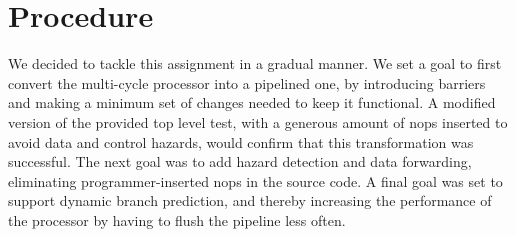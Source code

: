 \section{Procedure}

We decided to tackle this assignment in a gradual manner.
We set a goal to first convert the multi-cycle processor into a pipelined one, by introducing barriers and making a minimum set of changes needed to keep it functional.
A modified version of the provided top level test, with a generous amount of nops inserted to avoid data and control hazards, would confirm that this transformation was successful.
The next goal was to add hazard detection and data forwarding, eliminating programmer-inserted nops in the source code.
A final goal was set to support dynamic branch prediction, and thereby increasing the performance of the processor by having to flush the pipeline less often.
